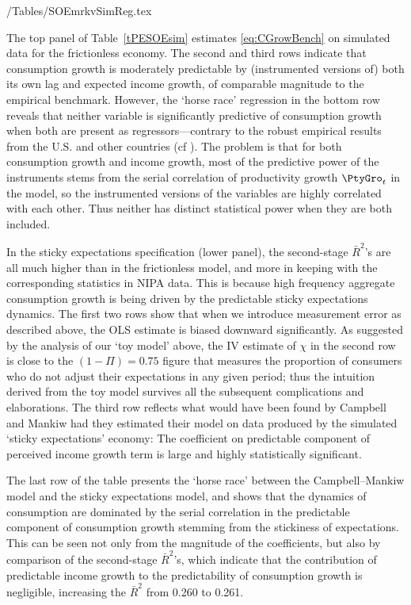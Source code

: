 \documentclass[titlepage]{\econtex}
\begin{document}
\econtexRoot/Tables/SOEmrkvSimReg.tex

The top panel of Table~\ref{tPESOEsim} estimates \eqref{eq:CGrowBench} on simulated data for the frictionless economy.  The second and third rows indicate that consumption growth is moderately predictable by (instrumented versions of) both its own lag and expected income growth, of comparable magnitude to the empirical benchmark.  However, the `horse race' regression in the bottom row reveals that neither variable is significantly predictive of consumption growth when both are present as regressors---contrary to the robust empirical results from the U.S. and other countries (cf \cite{cssIntlStickyC}).  The problem is that for both consumption growth and income growth, most of the predictive power of the instruments stems from the serial correlation of productivity growth $\PtyGro_t$ in the model, so the instrumented versions of the variables are highly correlated with each other.  Thus neither has distinct statistical power when they are both included.

In the sticky expectations specification (lower panel), the second-stage $\bar{R}^{2}$'s are all much higher than in the frictionless model, and more in keeping with the corresponding statistics in NIPA data. This is because high frequency aggregate consumption growth is being driven by the predictable sticky expectations dynamics. The first two rows show that when we introduce measurement error as described above, the OLS estimate is biased downward significantly. As suggested by the analysis of our `toy model' above, the IV estimate of $\chi$ in the second row is close to the $(1-\Pi)=0.75$ figure that measures the proportion of consumers who do not adjust their expectations in any given period; thus the intuition derived from the toy model survives all the subsequent complications and elaborations. The third row reflects what would have been found by Campbell and Mankiw had they estimated their model on data produced by the simulated `sticky expectations' economy:  The coefficient on predictable component of perceived income growth term is large and highly statistically significant.

The last row of the table presents the `horse race' between the Campbell--Mankiw model and the sticky expectations model, and shows that the dynamics of consumption are dominated by the serial correlation in the predictable component of consumption growth stemming from the stickiness of expectations.  This can be seen not only from the magnitude of the coefficients, but also by comparison of the second-stage $\bar{R}^{2}$'s, which indicate that the contribution of predictable income growth to the predictability of consumption growth is negligible, increasing the $\bar{R}^2$ from 0.260 to 0.261.
\end{document}
